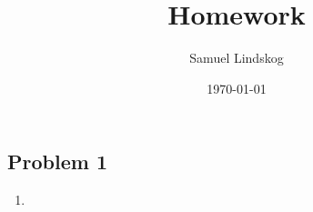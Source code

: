 \documentclass{article}
\title{Homework}
\author{Samuel Lindskog}
\date\today
\begin{document}
\maketitle %

\subsection*{Problem 1}
\begin{enumerate}[label=(\alph*)]
	\item
\end{enumerate}
\end{document}
